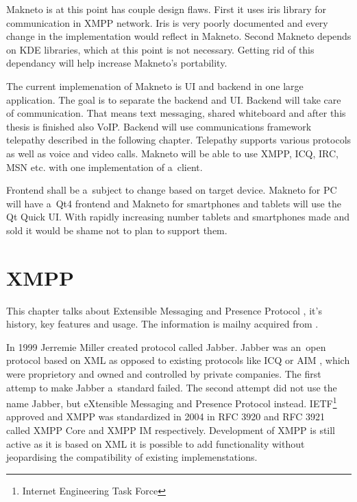 Makneto is at this point has couple design flaws. First it uses iris library for communication in XMPP network. Iris is very poorly documented and every change in the implementation would reflect in Makneto. Second Makneto depends on KDE libraries, which at this point is not necessary. Getting rid of this dependancy will help increase Makneto's portability. 

The current implemenation of Makneto is UI and backend in one large application. The goal is to separate the backend and UI. Backend will take care of communication. That means text messaging, shared whiteboard and after this thesis is finished also VoIP. Backend will use communications framework telepathy described in the following chapter. Telepathy supports various protocols as well as voice and video calls. Makneto will be able to use XMPP, ICQ, IRC, MSN etc. with one implementation of a~client.

Frontend shall be a~subject to change based on target device. Makneto for PC will have a~Qt4 frontend and Makneto for smartphones and tablets will use the Qt Quick UI. With rapidly increasing number tablets and smartphones made and sold it would be shame not to plan to support them.  




\chapter{XMPP}\label{chapter:xmpp}
This chapter talks about Extensible Messaging and Presence Protocol \cite{xmpp}, it's history, key features and usage. The information is mailny acquired from \cite{xmppBook,xmppCoreRFC,xmppIMRFC}.

In 1999 Jerremie Miller created protocol called Jabber. Jabber was an~open protocol based on XML as opposed to existing protocols like ICQ \cite{ICQ} or AIM \cite{AIM}, which were proprietory and owned and controlled by private companies. The first attemp to make Jabber a~standard failed. The second attempt did not use the name Jabber, but eXtensible Messaging and Presence Protocol instead. IETF\footnote{Internet Engineering Task Force} approved and XMPP was standardized in 2004 in RFC 3920 and RFC 3921 called XMPP Core and XMPP IM respectively. Development of XMPP is still active as it is based on XML it is possible to add functionality without jeopardising the compatibility of existing implemenstations.      

